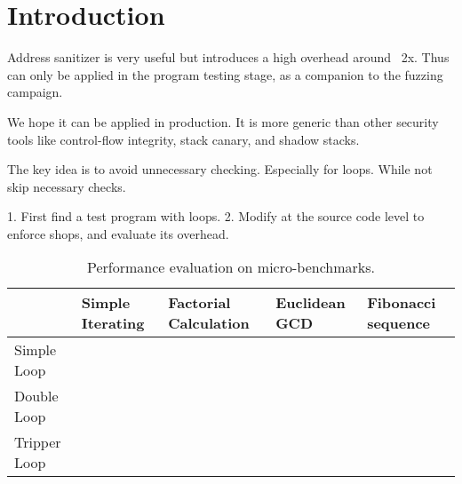 \section{Introduction}

Address sanitizer is very useful but introduces a high overhead around ~2x.
Thus can only be applied in the program testing stage, as a companion to the fuzzing campaign.

We hope it can be applied in production.
It is more generic than other security tools like control-flow integrity, stack canary, and shadow stacks.


The key idea is to avoid unnecessary checking. Especially for loops.
While not skip necessary checks.

1. First find a test program with loops.
2. Modify at the source code level to enforce shops, and evaluate its overhead.


\begin{table}[tp]
    \begin{tabular}{|l|l|l|l|l|}
        \hline
                     & Simple Iterating & Factorial Calculation & Euclidean GCD & Fibonacci sequence \\ \hline
        Simple Loop  &                  &                       &               &                    \\ \hline
        Double Loop  &                  &                       &               &                    \\ \hline
        Tripper Loop &                  &                       &               &                    \\ \hline
    \end{tabular}
    \caption{Performance evaluation on micro-benchmarks.}
\end{table}